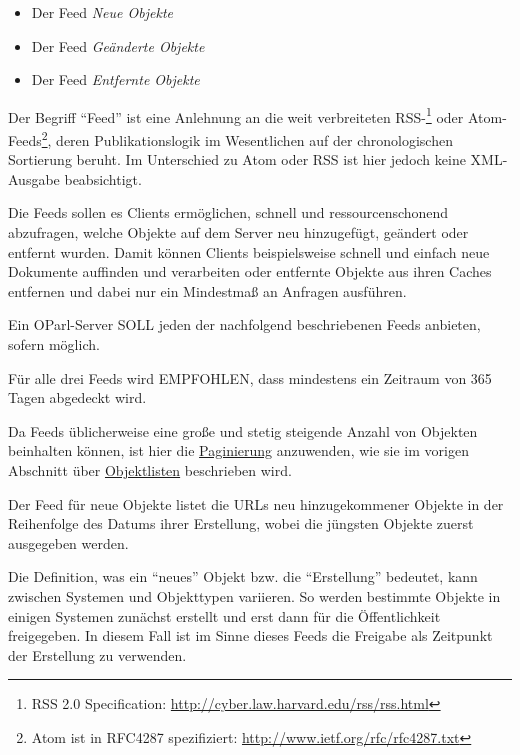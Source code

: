 \documentclass[,a4paper]{article}
\begin{document}
\begin{itemize}
\itemsep1pt\parskip0pt
\item
  Der Feed \emph{Neue Objekte}
\item
  Der Feed \emph{Geänderte Objekte}
\item
  Der Feed \emph{Entfernte Objekte}
\end{itemize}

Der Begriff ``Feed'' ist eine Anlehnung an die weit verbreiteten
RSS-\footnote{RSS 2.0 Specification:
  \url{http://cyber.law.harvard.edu/rss/rss.html}} oder
Atom-Feeds\footnote{Atom ist in RFC4287 spezifiziert:
  \url{http://www.ietf.org/rfc/rfc4287.txt}}, deren Publikationslogik im
Wesentlichen auf der chronologischen Sortierung beruht. Im Unterschied
zu Atom oder RSS ist hier jedoch keine XML-Ausgabe beabsichtigt.

Die Feeds sollen es Clients ermöglichen, schnell und ressourcenschonend
abzufragen, welche Objekte auf dem Server neu hinzugefügt, geändert oder
entfernt wurden. Damit können Clients beispielsweise schnell und einfach
neue Dokumente auffinden und verarbeiten oder entfernte Objekte aus
ihren Caches entfernen und dabei nur ein Mindestmaß an Anfragen
ausführen.

Ein OParl-Server SOLL jeden der nachfolgend beschriebenen Feeds
anbieten, sofern möglich.

Für alle drei Feeds wird EMPFOHLEN, dass mindestens ein Zeitraum von 365
Tagen abgedeckt wird.

Da Feeds üblicherweise eine große und stetig steigende Anzahl von
Objekten beinhalten können, ist hier die
\hyperref[paginierung]{Paginierung} anzuwenden, wie sie im vorigen
Abschnitt über \hyperref[objektlisten]{Objektlisten} beschrieben wird.


Der Feed für neue Objekte listet die URLs neu hinzugekommener Objekte in
der Reihenfolge des Datums ihrer Erstellung, wobei die jüngsten Objekte
zuerst ausgegeben werden.

Die Definition, was ein ``neues'' Objekt bzw. die ``Erstellung''
bedeutet, kann zwischen Systemen und Objekttypen variieren. So werden
bestimmte Objekte in einigen Systemen zunächst erstellt und erst dann
für die Öffentlichkeit freigegeben. In diesem Fall ist im Sinne dieses
Feeds die Freigabe als Zeitpunkt der Erstellung zu verwenden.
\end{document}
